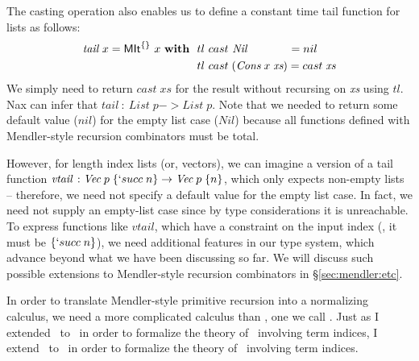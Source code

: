 The casting operation also enables us to define a constant time tail function for
lists as follows:
\begin{align*}
\textit{tail}~x = \textsf{MIt}^{\{\}}~x~\textbf{with}~~
&  tl ~cast~\textit{Nil}~~~~~~~~~~~ = nil \\
&  tl ~cast\;(\textit{Cons}\;x\;\textit{xs}) = cast\;\textit{xs}
\end{align*}
We simply need to return $cast\;\textit{xs}$ for the result
without recursing on \textit{xs} using $tl$. Nax can infer that
$\textit{tail} ~:~ \textit{List}\;p -> \textit{List}\;p$.
Note that we needed to return some default value ($nil$) for the empty list case
($Nil$) because all functions defined with Mendler-style recursion combinators
must be total. 

However, for length index lists (or, vectors), we can imagine
a version of a tail function
$\textit{vtail}\,:\textit{Vec}\;p\;\{`succ\;n\} -> \textit{Vec}\;p\;\{n\}$,
which only expects non-empty lists -- therefore, we need not specify a default
value for the empty list case. In fact, we need not supply an empty-list case
since by type considerations it is unreachable. To express functions like
$vtail$, which have a constraint on the input index (\ie, it must be
$\{`succ\;n\}$), we need additional features in our type system, which advance
beyond what we have been discussing so far. We will discuss such possible
extensions to Mendler-style recursion combinators in \S\ref{sec:mendler:etc}.

In order to translate Mendler-style primitive recursion into
a normalizing calculus, we need a more complicated calculus than \Fi,
one we call \Fixi. Just as I extended \Fw\ to \Fi\ in order to formalize
the theory of \MIt\ involving term indices, I extend \Fixw\ to \Fixi\
in order to formalize the theory of \MPr\ involving term indices.

